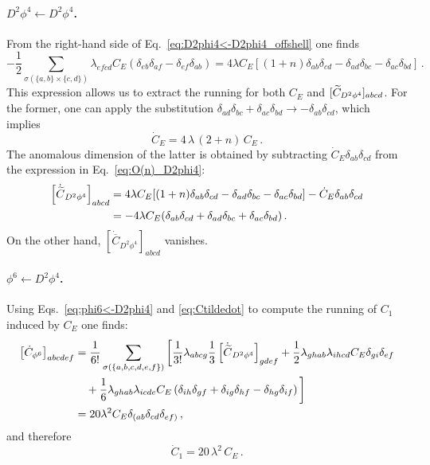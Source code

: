 \paragraph{\texorpdfstring{$D^2\phi^4 \leftarrow D^2\phi^4$}{D2phi4fromD2phi4}.}
From the right-hand side of Eq.~\eqref{eq:D2phi4<-D2phi4_offshell} one finds
\begin{equation}
    -\frac{1}{2}\sum_{\sigma(\{a,b\}\times \{c,d\})}\lambda_{efcd}C_E\left(\delta_{eb}\delta_{af}-\delta_{ef}\delta_{ab}\right) = 4\lambda C_E  [(1+n)\delta_{ab}\delta_{cd}-\delta_{ad}\delta_{bc}-\delta_{ac}\delta_{bd}]\,.
    \label{eq:O(n)_D2phi4}
\end{equation}
This expression allows us to extract the running for both $C_E$ and $[\widetilde{C}_{D^2\phi^4}]_{abcd}$.
For the former, one can apply the substitution $\delta_{ad}\delta_{bc}+\delta_{ac}\delta_{bd} \to -\delta_{ab}\delta_{cd}$, which implies
\begin{equation}
    \dot C_E = 4\,\lambda\, (2+n)\, C_E\,.
\end{equation}
The anomalous dimension of the latter is obtained by subtracting $\dot C_E \delta_{ab}\delta_{cd}$ from the expression in Eq.~\eqref{eq:O(n)_D2phi4}:
\begin{align}
    \left[\dot{\widetilde{C}}_{D^2\phi^4}\right]_{abcd} &= 4\lambda C_E  [(1+n)\delta_{ab}\delta_{cd}-\delta_{ad}\delta_{bc}-\delta_{ac}\delta_{bd}] - \dot C_E \delta_{ab}\delta_{cd}\nonumber \\
    &= -4\lambda C_E (\delta_{ab}\delta_{cd}+\delta_{ad}\delta_{bc}+\delta_{ac}\delta_{bd})\,.
    \label{eq:Ctildedot}
\end{align}
On the other hand, $[\dot{\overline C}_{D^2\phi^4}]_{abcd}$ vanishes.

\paragraph{\texorpdfstring{$\phi^6\leftarrow D^2\phi^4$}{phi6fromD2phi4}.}
Using Eqs.~\eqref{eq:phi6<-D2phi4} and \eqref{eq:Ctildedot} to compute the running of $C_1$ induced by $C_E$ one finds:
\begin{align}
    \left[\dot C_{\phi^6}\right]_{abcdef} &= 
    \frac{1}{6!}\sum_{\sigma(\{a,b,c,d,e,f\})}
    \bigg[
    \frac{1}{3!}\lambda_{abcg}\frac{1}{3}\left[\dot{\widetilde{C}}_{D^2\phi^4}\right]_{gdef}
    +
    \frac{1}{2}\lambda_{ghab}\lambda_{ihcd}C_E \delta_{gi}\delta_{ef}\nonumber\\
    &\quad +\frac{1}{6}\lambda_{ghab}\lambda_{icde}C_E\left(\delta_{ih}\delta_{gf}+\delta_{ig}\delta_{hf}-\delta_{hg}\delta_{if}\right)\bigg] \nonumber \\
    &= 20 \lambda^2 C_E \delta_{(ab}\delta_{cd}\delta_{ef)}\,,
\end{align}
and therefore
\begin{equation}
    \dot C_1 = 20\, \lambda^2\, C_E\,.
\end{equation}

